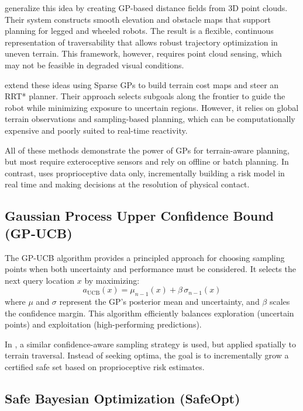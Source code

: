 \textcite{uttsha2024gaussianprocessdistancefields} generalize this idea by creating GP-based distance fields from 3D point clouds. Their system constructs smooth elevation and obstacle maps that support planning for legged and wheeled robots. The result is a flexible, continuous representation of traversability that allows robust trajectory optimization in uneven terrain. This framework, however, requires point cloud sensing, which may not be feasible in degraded visual conditions.

\textcite{leininger2024gaussianprocessbasedtraversabilityanalysis} extend these ideas using Sparse GPs to build terrain cost maps and steer an RRT* planner. Their approach selects subgoals along the frontier to guide the robot while minimizing exposure to uncertain regions. However, it relies on global terrain observations and sampling-based planning, which can be computationally expensive and poorly suited to real-time reactivity.

All of these methods demonstrate the power of GPs for terrain-aware planning, but most require exteroceptive sensors and rely on offline or batch planning. In contrast, \algoname{} uses proprioceptive data only, incrementally building a risk model in real time and making decisions at the resolution of physical contact.

\subsection{Gaussian Process Upper Confidence Bound (GP-UCB)}

The GP-UCB algorithm provides a principled approach for choosing sampling points when both uncertainty and performance must be considered. It selects the next query location \( x \) by maximizing:
\[
a_{\text{UCB}}(x) = \mu_{n-1}(x) + \beta\, \sigma_{n-1}(x)
\]
where \( \mu \) and \( \sigma \) represent the GP’s posterior mean and uncertainty, and \( \beta \) scales the confidence margin. This algorithm efficiently balances exploration (uncertain points) and exploitation (high-performing predictions).

In \algoname{}, a similar confidence-aware sampling strategy is used, but applied spatially to terrain traversal. Instead of seeking optima, the goal is to incrementally grow a certified safe set based on proprioceptive risk estimates.

\subsection{Safe Bayesian Optimization (SafeOpt)}

